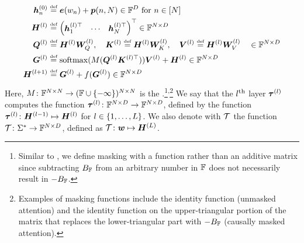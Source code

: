 \begin{subequations}
   \begin{align}
      {{{{{\bm{h}}}}}}^{(0)}_{{n}} &\mathrel{\stackrel{\textnormal{\tiny def}}{=}} {\bm{e}}({{w}}_{{n}}) + {\bm{p}}({{n}}, {{N}}) \in {{\mathbb{F}}}^{{{D}}} \text{ for } {{n}} \in {\left[ {{N}}\right]} \\
      {{{{{\bm{H}}}}}}^{({{l}})} &\mathrel{\stackrel{\textnormal{\tiny def}}{=}} \begin{pmatrix}
         {{{{{\bm{h}}}}}}^{({{l}})\top}_1 &
         \cdots &
         {{{{{\bm{h}}}}}}^{({{l}})\top}_{{N}}
      \end{pmatrix}^\top \in {{\mathbb{F}}}^{{{N}} \times {{D}}} \\
      {{{{{\bm{Q}}}}}}^{({{l}})} &\mathrel{\stackrel{\textnormal{\tiny def}}{=}} {{{{{\bm{H}}}}}}^{({{l}})} {{{\bm{W}}}}_Q^{({{l}})}, \quad 
      {{{{{\bm{K}}}}}}^{({{l}})} \mathrel{\stackrel{\textnormal{\tiny def}}{=}} {{{{{\bm{H}}}}}}^{({{l}})} {{{\bm{W}}}}_K^{({{l}})}, \quad
      {{{{{\bm{V}}}}}}^{({{l}})} \mathrel{\stackrel{\textnormal{\tiny def}}{=}} {{{{{\bm{H}}}}}}^{({{l}})} {{{\bm{W}}}}_V^{({{l}})} \quad \in {{\mathbb{F}}}^{{{N}} \times {{D}}} \\
      {{{\bm{G}}}}^{({{l}})} &\mathrel{\stackrel{\textnormal{\tiny def}}{=}} {{\mathrm{softmax}}}({{{{M}}({{{{{\bm{Q}}}}}}^{({{l}})} {{{{{\bm{K}}}}}}^{({{l}})\top})}}) {{{{{\bm{V}}}}}}^{({{l}})} + {{{{{\bm{H}}}}}}^{({{l}})} \in {{\mathbb{F}}}^{{{N}} \times {{D}}} \label{eq:softmax-attention-matrix} \\
      {{{{{\bm{H}}}}}}^{({{l}} + 1)} &\mathrel{\stackrel{\textnormal{\tiny def}}{=}} {{{\bm{G}}}}^{({{l}})} + {{{f}}}({{{\bm{G}}}}^{({{l}})}) \in {{\mathbb{F}}}^{{{N}} \times {{D}}}
   \end{align} 
\end{subequations}
Here, ${{M}}\colon {{\mathbb{F}}}^{{{N}} \times {{N}}} \to ({{\mathbb{F}}} \cup {\left\{ -\infty \right\}})^{{{N}} \times {{N}}}$ is the .\footnote{Similar to \citet{li2024chain,saunshi2025reasoninglatentthoughtspower}, we define masking with a function rather than an additive matrix since subtracting ${{B_{{{\mathbb{F}}}}}}$ from an arbitrary number in ${{\mathbb{F}}}$ does not necessarily result in $-{{B_{{{\mathbb{F}}}}}}$.}\textsuperscript{,}\footnote{Examples of masking functions include the identity function (unmasked attention) and the identity function on the upper-triangular portion of the matrix that replaces the lower-triangular part with $-{{B_{{{\mathbb{F}}}}}}$ (causally masked attention).}
We say that the ${{l}}\textsuperscript{th}$ layer ${{\boldsymbol{\tau}}}^{({{l}})}$ computes the function ${{\boldsymbol{\tau}}}^{({{l}})}\colon {{\mathbb{F}}}^{{{N}} \times {{D}}} \to {{\mathbb{F}}}^{{{N}} \times {{D}}}$, defined by the function ${{\boldsymbol{\tau}}}^{({{l}})}\colon {{{{{\bm{H}}}}}}^{({{l}} - 1)} \mapsto {{{{{\bm{H}}}}}}^{({{l}})}$ for ${{l}} \in {\left\{ 1, \ldots, {{L}}\right\}}$.
We also denote with ${{\mathcal{T}}}$ the function ${{\mathcal{T}}}\colon {{{{{{\Sigma}}^{*}}}}} \to {{\mathbb{F}}}^{{{N}} \times {{D}}}$, defined as ${{\mathcal{T}}}\colon {{\boldsymbol{w}}} \mapsto {{{{{\bm{H}}}}}}^{({{L}})}$.

